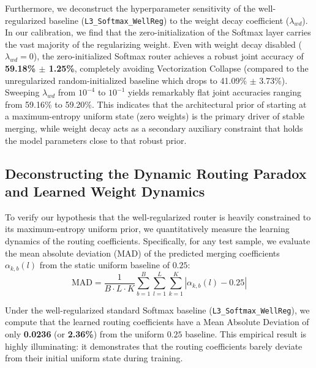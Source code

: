 Furthermore, we deconstruct the hyperparameter sensitivity of the well-regularized baseline (\texttt{L3\_Softmax\_WellReg}) to the weight decay coefficient ($\lambda_{wd}$). In our calibration, we find that the zero-initialization of the Softmax layer carries the vast majority of the regularizing weight. Even with weight decay disabled ($\lambda_{wd} = 0$), the zero-initialized Softmax router achieves a robust joint accuracy of \textbf{59.18\% $\pm$ 1.25\%}, completely avoiding Vectorization Collapse (compared to the unregularized random-initialized baseline which drops to 41.09\% $\pm$ 3.73\%). Sweeping $\lambda_{wd}$ from $10^{-4}$ to $10^{-1}$ yields remarkably flat joint accuracies ranging from 59.16\% to 59.20\%. This indicates that the architectural prior of starting at a maximum-entropy uniform state (zero weights) is the primary driver of stable merging, while weight decay acts as a secondary auxiliary constraint that holds the model parameters close to that robust prior.

\subsection{Deconstructing the Dynamic Routing Paradox and Learned Weight Dynamics}
To verify our hypothesis that the well-regularized router is heavily constrained to its maximum-entropy uniform prior, we quantitatively measure the learning dynamics of the routing coefficients. Specifically, for any test sample, we evaluate the mean absolute deviation (MAD) of the predicted merging coefficients $\alpha_{k, b}(l)$ from the static uniform baseline of $0.25$:
\begin{equation}
    \text{MAD} = \frac{1}{B \cdot L \cdot K} \sum_{b=1}^B \sum_{l=1}^L \sum_{k=1}^K \left| \alpha_{k, b}(l) - 0.25 \right|
\end{equation}

Under the well-regularized standard Softmax baseline (\texttt{L3\_Softmax\_WellReg}), we compute that the learned routing coefficients have a Mean Absolute Deviation of only \textbf{0.0236} (or \textbf{2.36\%}) from the uniform $0.25$ baseline. This empirical result is highly illuminating: it demonstrates that the routing coefficients barely deviate from their initial uniform state during training. 

